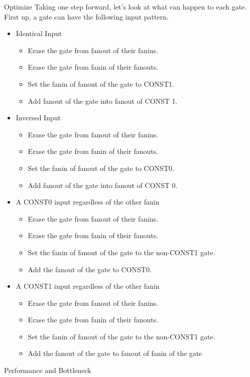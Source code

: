 \documentclass[12pt,a4paper]{report}
\begin{document}
\begin{section}{Optimize}
  Taking one step forward, let's look at what can happen to each gate. First up, a gate can have the
  following input pattern.
\begin{itemize}
  \item Identical Input
  \begin{itemize}
    \item Erase the gate from fanout of their fanins.
    \item Erase the gate from fanin of their fanouts.
    \item Set the fanin of fanout of the gate to CONST1.
    \item Add fanout of the gate into fanout of CONST 1.
  \end{itemize}
  \item Inversed Input
  \begin{itemize}
    \item Erase the gate from fanout of their fanins.
    \item Erase the gate from fanin of their fanouts.
    \item Set the fanin of fanout of the gate to CONST0.
    \item Add fanout of the gate into fanout of CONST 0.
  \end{itemize}
  \item A CONST0 input regardless of the other fanin
  \begin{itemize}
    \item Erase the gate from fanout of their fanins.
    \item Erase the gate from fanin of their fanouts.
    \item Set the fanin of fanout of the gate to the non-CONST1 gate.
    \item Add the fanout of the gate to CONST0.
  \end{itemize}
  \item A CONST1 input regardless of the other fanin
  \begin{itemize}
    \item Erase the gate from fanout of their fanins.
    \item Erase the gate from fanin of their fanouts.
    \item Set the fanin of fanout of the gate to the non-CONST1 gate. 
    \item Add the fanout of the gate to fanout of fanin of the gate
  \end{itemize}
\end{itemize}
\begin{subsection}{Performance and Bottleneck}

\end{subsection}
\end{section}
\end{document}
